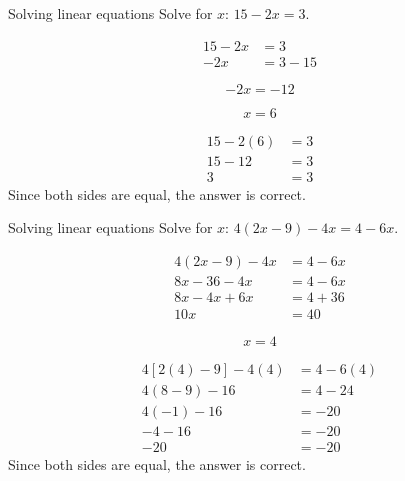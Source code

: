     
\begin{wex}{Solving linear equations }
{%
Solve for $x$: $15-2x=3$.
}{%

\begin{align*}
  15-2x &= 3 \\
  -2x &= 3-15
\end{align*}

\begin{equation*}
  -2x = -12
\end{equation*}

\begin{equation*}
  x = 6
\end{equation*}

\begin{align*}
  15 - 2(6) &= 3 \\
  15 - 12 &= 3 \\
  3 &= 3
\end{align*}
Since both sides are equal, the answer is correct. 
}
\end{wex}

\begin{wex}
{Solving linear equations }
{Solve for $x$: $4(2x-9)-4x=4-6x$.}
{%

\begin{align*}
  4(2x-9)-4x &= 4-6x \\
  8x-36-4x &= 4-6x \\
  8x-4x+6x &= 4+36 \\
  10x &= 40
\end{align*}

\begin{equation*}
  x = 4
\end{equation*}

\begin{align*}
  4\left[2(4)-9\right]-4(4) &= 4-6(4) \\
  4(8-9)-16 &= 4-24 \\
  4(-1)-16 &= -20 \\
  -4-16 &= -20 \\
  -20 &= -20
\end{align*}
Since both sides are equal, the answer is correct. 
}
\end{wex}

